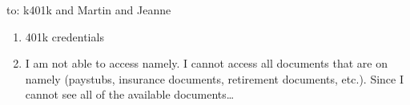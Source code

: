 \documentclass[11pt]{article}
\author{Ryan Hammang}
\date{\today}
\title{}
\begin{document}
\tableofcontents

to: k401k and Martin and Jeanne
\begin{enumerate}
\item 401k credentials
\item I am not able to access namely. I cannot access all documents that are on namely (paystubs, insurance documents, retirement documents, etc.). Since I cannot see all of the available documents\ldots{}
\end{enumerate}
\end{document}
